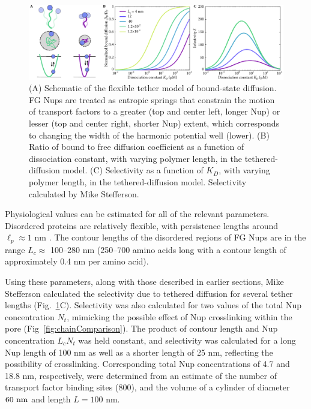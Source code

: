 \begin{figure}[t!]
\centering
\includegraphics[width=\textwidth]{figs/ch02/fig3.pdf}
\caption[Selectivity from tethered diffusion.]{(A) Schematic of the flexible tether model of bound-state
  diffusion. FG Nups are treated as entropic springs that constrain
  the motion of transport factors to a greater (top and center left, longer Nup) or lesser
  (top and center right, shorter Nup) extent, which corresponds to changing
  the width of the harmonic potential well (lower).  (B) Ratio of bound to
  free diffusion coefficient as a function of dissociation constant,
  with varying polymer length, in the tethered-diffusion model.  (C)
  Selectivity as a function of $K_D$, with varying polymer length, in
  the tethered-diffusion model.  Selectivity calculated by Mike Stefferson.}
\label{fig:tethers}
\end{figure}

Physiological values can be estimated for all of the relevant parameters.  Disordered proteins are relatively flexible, with persistence lengths around $\ell_p \approx 1$ nm \cite{receveur-brechot12}.  The contour lengths of the disordered regions of FG Nups are in the range $L_c\approx$ 100--280 nm (250--700 amino acids long \cite{patel07} with a contour length of approximately 0.4 nm per amino acid).

Using these parameters, along with those described in earlier sections, Mike Stefferson calculated the selectivity due to tethered diffusion for several tether lengths (Fig.~\ref{fig:tethers}C).  Selectivity was also calculated for two values of the total Nup concentration $N_t$, mimicking the possible effect of Nup crosslinking within the pore (Fig~\ref{fig:chainComparison}).  The product of contour length and Nup concentration $L_cN_t$ was held constant, and selectivity was calculated for a long Nup length of 100 nm as well as a shorter length of 25 nm, reflecting the possibility of crosslinking.  Corresponding total Nup concentrations of 4.7 and 18.8 nm, respectively, were determined from an estimate of the number of transport factor binding sites ($800$), and the volume of a cylinder of diameter $60\ \nm$ and length $L = 100$ nm. 

